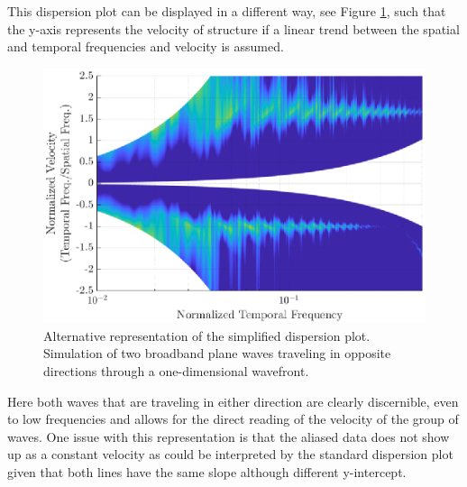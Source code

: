 This dispersion plot can be displayed in a different way, see Figure \ref{fig:04_simple_dispersion_vel}, such that the y-axis represents the velocity of structure if a linear trend between the spatial and temporal frequencies and velocity is assumed.
\begin{figure}
 \centering
 \includegraphics{../matlab/04_basic_filtering/simple_dispersion_vel.eps}
 \caption{Alternative representation of the simplified dispersion plot.  Simulation of two broadband plane waves traveling in opposite directions through a one-dimensional wavefront.}
 \label{fig:04_simple_dispersion_vel}
\end{figure}
Here both waves that are traveling in either direction are clearly discernible, even to low frequencies and allows for the direct reading of the velocity of the group of waves.
One issue with this representation is that the aliased data does not show up as a constant velocity as could be interpreted by the standard dispersion plot given that both lines have the same slope although different y-intercept.

